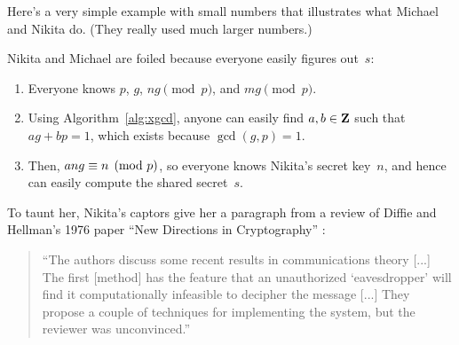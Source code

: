 Here's a very simple example with small numbers that illustrates what
Michael and Nikita do.  (They really used much larger numbers.)
\begin{center}
\end{center}

Nikita and Michael are foiled because everyone easily figures
out~$s$:
\begin{enumerate}
\item Everyone knows $p$, $g$, $ng\pmod{p}$, and $mg\pmod{p}$.
\item Using Algorithm~\ref{alg:xgcd}, anyone can
easily find $a,b\in\mathbf{Z}$
such that $ag + bp = 1$, which exists because
$\gcd(g,p)=1$.
\item Then, $ang \equiv n\pmod{p}$, so everyone knows Nikita's
secret key~$n$, and hence can easily compute the shared
secret~$s$.
\end{enumerate}

To taunt her, Nikita's captors give her a paragraph from a review of Diffie
and Hellman's 1976 paper ``New Directions in Cryptography'' \cite{dh76}:
\begin{quote}
``The authors discuss some recent results in communications theory
[...]  The first [method] has the feature that an unauthorized
`eavesdropper' will find it computationally infeasible to decipher
the message [...] They propose a couple of techniques for implementing
the system, but the reviewer was unconvinced.''
\end{quote}

